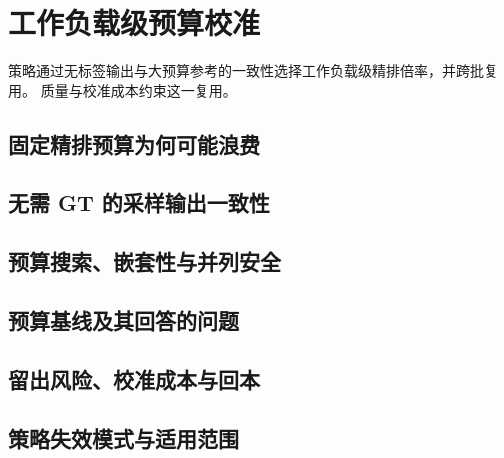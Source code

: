 \chapter{工作负载级预算校准}
\label{ch:refinement}
策略通过无标签输出与大预算参考的一致性选择工作负载级精排倍率，并跨批复用。
质量与校准成本约束这一复用。

\section{固定精排预算为何可能浪费}
\label{sec:6-1}


\section{无需 GT 的采样输出一致性}
\label{sec:6-2}


\section{预算搜索、嵌套性与并列安全}
\label{sec:6-3}


\section{预算基线及其回答的问题}
\label{sec:6-4}


\section{留出风险、校准成本与回本}
\label{sec:6-5}


\section{策略失效模式与适用范围}
\label{sec:6-6}

